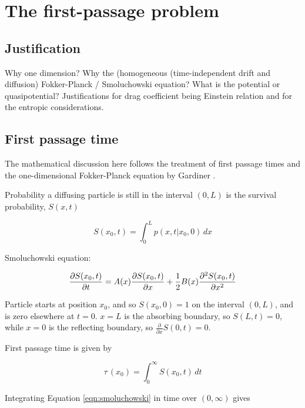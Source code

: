 \chapter{The first-passage problem}
\label{first_passage}

\section{Justification}

Why one dimension?  Why the (homogeneous (time-independent drift and diffusion) Fokker-Planck / Smoluchowski equation?  What is the potential or quasipotential?  Justifications for drag coefficient being Einstein relation and for the entropic considerations.

\section{First passage time}

The mathematical discussion here follows the treatment of first passage times and the one-dimensional Fokker-Planck equation by Gardiner \citep{Gardiner1985}.

Probability a diffusing particle is still in the interval $(0,L)$ is the survival probability, $S(x,t)$

\begin{equation}
S(x_0,t) = \int_{0}^{L} p(x,t \lvert x_0,0) \,dx
\label{eqn:survival}
\end{equation}

Smoluchowski equation:

\begin{equation}
\frac{\partial S(x_0,t)}{\partial t} = A(x) \frac{\partial S(x_0,t)}{\partial x} + \frac{1}{2} B(x) \frac{\partial^2 S(x_0,t)}{\partial x^2}
\label{eqn:smoluchowski}
\end{equation}

Particle starts at position $x_0$, and so $S(x_0,0) = 1$ on the interval $(0,L)$, and is zero elsewhere at $t=0$.  $x=L$ is the absorbing boundary, so $S(L,t)=0$, while $x=0$ is the reflecting boundary, so $\frac{\partial}{\partial x} S(0,t)=0$.

First passage time is given by

\begin{equation}
\tau \, (x_0) = \int_{0}^{\infty} S(x_0,t) \,dt
\label{eqn:first_passage}
\end{equation}

Integrating Equation \ref{eqn:smoluchowski} in time over $(0,\infty)$ gives

